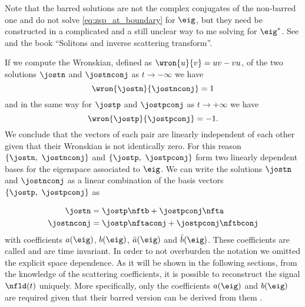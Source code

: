 \begin{extendedthesis}
Note that the barred solutions are not the complex conjugates of the non-barred
one and do not solve \eqref{eq:zsp_at_boundary} for $\eig$, but they need be constructed in a complicated and a still unclear way to me solving for $\eig^*$. See \cite{Yousefi2014} and the book ``Solitons and inverse scattering transform''.
\end{extendedthesis}
If we compute the Wronskian, defined as $\wron{u}{v} = uv - vu$, of the two
solutions  $\jostn$ and $\jostnconj$ as $t\rightarrow - \infty$ we have
\begin{equation}
  \wron{\jostn}{\jostnconj} = 1
\end{equation}
and in the same way for $\jostp$ and $\jostpconj$ as $t\rightarrow + \infty$ we
have
\begin{equation}
  \wron{\jostp}{\jostpconj} = -1.
\end{equation}
We conclude that the vectors of each pair are linearly independent of each other given that their Wronskian is not identically zero. For this reason
$\{\jostn,~\jostnconj\}$ and $\{\jostp,~\jostpconj\}$ form two linearly
dependent bases for the eigenspace associated to $\eig$.
We can write the solutions $\jostn$ and $\jostnconj$ as a linear combination of the
basis vectors $\{\jostp,~\jostpconj\}$ as

\begin{subequations}\label{eq:jost_projection}
  \begin{align}\label{eq:jost_projection_1}
  \jostn&=\jostp \nftb+ \jostpconj \nfta\\
  \jostnconj&=\jostp \nftaconj+ \jostpconj \nftbconj
  \end{align}
\end{subequations}
with coefficients $a(\eig)$, $b(\eig)$, $\bar{a}(\eig)$ and $\bar{b}(\eig)$.
These coefficients are called \textit{\scatcoef} and are time invariant. In order to not overburden the notation we omitted the explicit space
dependence.
As it will be shown in the following sections, from the knowledge of the
scattering coefficients, it is possible to reconstruct the signal $\nfld(t)$
uniquely. More specifically, only the coefficients $a(\eig)$ and $b(\eig)$ are
required given that their barred version can be derived from them \cite{Yousefi2014}.


